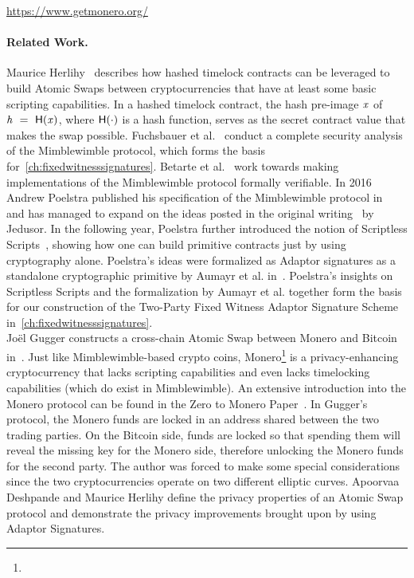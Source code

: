 \urldef{\urlmonero}\url{https://www.getmonero.org/}

\paragraph{Related Work.} Maurice Herlihy~\cite{herlihy2018atomic} describes how hashed timelock contracts can be leveraged to build Atomic Swaps between cryptocurrencies that have at least some basic scripting capabilities.
In a hashed timelock contract, the hash pre-image $\mathit{x}$ of $\mathit{h} ~=~ \mathsf{H} (\mathit{x})$, where $\mathsf{H} (\cdot)$ is a hash function, serves as the secret contract value that makes the swap possible.
Fuchsbauer et al.~\cite{fuchsbauer2019aggregate} conduct a complete security analysis of the Mimblewimble protocol, which forms the basis for~\cref{ch:fixedwitnesssignatures}.
Betarte et al.~\cite{betarte2019towards} work towards making implementations of the Mimblewimble protocol formally verifiable.
In 2016 Andrew Poelstra published his specification of the Mimblewimble protocol in~\cite{poelstra2016mimblewimble} and has managed to expand on the ideas posted in the original writing~\cite{jedusor2016mimblewimble} by Jedusor.
In the following year, Poelstra further introduced the notion of Scriptless Scripts~\cite{poelstra2017scriptless}, showing how one can build primitive contracts just by using cryptography alone.
Poelstra's ideas were formalized as Adaptor signatures as a standalone cryptographic primitive by Aumayr et al. in~\cite{aumayr2020bitcoinchannels}.
Poelstra's insights on Scriptless Scripts and the formalization by Aumayr et al. together form the basis for our construction of the Two-Party Fixed Witness Adaptor Signature Scheme in~\cref{ch:fixedwitnesssignatures}.\\
Joël Gugger constructs a cross-chain Atomic Swap between Monero and Bitcoin in~\cite{gugger2020bitcoin}.
Just like Mimblewimble-based crypto coins, Monero\footnote{\urlmonero} is a privacy-enhancing cryptocurrency that lacks scripting capabilities and even lacks timelocking capabilities (which do exist in Mimblewimble).
An extensive introduction into the Monero protocol can be found in the Zero to Monero Paper~\cite{alonso2020zero}.
In Gugger's protocol, the Monero funds are locked in an address shared between the two trading parties.
On the Bitcoin side, funds are locked so that spending them will reveal the missing key for the Monero side, therefore unlocking the Monero funds for the second party.
The author was forced to make some special considerations since the two cryptocurrencies operate on two different elliptic curves.
Apoorvaa Deshpande and Maurice Herlihy define the privacy properties of an Atomic Swap protocol and demonstrate the privacy improvements brought upon by using Adaptor Signatures.~\cite{deshpande2020privacy}

